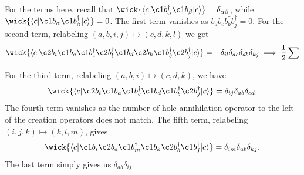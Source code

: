 For the terms here, recall that $\wick{\langle c \vert \c1 b_\alpha^\dagger \c1 b_\beta \vert c \rangle} = \delta_{\alpha \beta}$, while $\wick{\langle c \vert \c1 b_\alpha \c1 b_\beta^\dagger \vert c \rangle} = 0$.
The first term vanishes as $b_d b_c b_b^\dagger b_j^\dagger = 0$. %
For the second term, relabeling $(a, b, i, j) \mapsto (c, d, k, l)$ we get
\begin{equation*}
    \wick{
        \langle
        c \vert
        \c2 b_i
        \c1 b_a
        \c1 b_c^\dagger
        \c2 b_l^\dagger
        \c1 b_d
        \c2 b_k
        \c1 b_b^\dagger
        \c2 b_j^\dagger
        \vert c
        \rangle
    } = -\delta_{il} \delta_{ac} \delta_{db} \delta_{kj} \implies \frac{1}{2} \sum
\end{equation*}
\begin{comment}
    \begin{align*}
        \wick{
            \langle
            c \vert
            \c2 b_i
            \c1 b_a
            \underbrace{
                b_c^\dagger
                b_l^\dagger
                b_d
                b_k
            }_{\text{vanishes}}
            \c1 b_b^\dagger
            \c2 b_j^\dagger
            \vert c
            \rangle
        } &= 0, &
        \wick{
            \langle
            c \vert
            \c2 b_i
            \c1 b_a
            \c1 b_c^\dagger
            \c2 b_l^\dagger
            \c1 b_d
            \c2 b_k
            \c1 b_b^\dagger
            \c2 b_j^\dagger
            \vert c
            \rangle
        } &= -\delta_{il} \delta_{ac} \delta_{db} \delta_{kj}.
    \end{align*}
\end{comment}
For the third term, relabeling $(a, b, i) \mapsto (c, d, k)$, we have
\begin{equation*}
    \wick{
        \langle
        c \vert
        \c2 b_i
        \c1 b_a
        \c1 b_c^\dagger
        \c1 b_d
        \c1 b_b^\dagger
        \c2 b_j^\dagger
        \vert c
        \rangle
    } = \delta_{ij} \delta_{ab} \delta_{cd}.
\end{equation*}
The fourth term vanishes as the number of hole annihilation operator to the left of the creation operators does not match.
The fifth term, relabeling $(i, j, k) \mapsto (k, l, m)$, gives
\begin{equation*}
    \wick{
        \langle
        c \vert
        \c1 b_i
        \c2 b_a
        \c1 b_m^\dagger
        \c1 b_k
        \c2 b_b^\dagger
        \c1 b_j^\dagger
        \vert c
        \rangle
    } = \delta_{im} \delta_{ab} \delta_{kj}.
\end{equation*}
The last term simply gives us $\delta_{ab} \delta_{ij}$.

